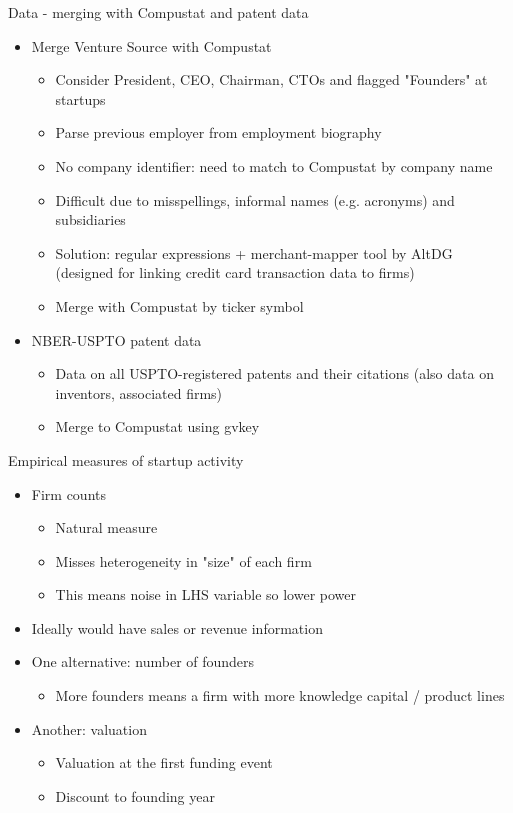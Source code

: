 \documentclass[english,usenames,dvipsnames]{beamer}
\begin{document}
\begin{frame}{Data - merging with Compustat and patent data}
\begin{itemize}
	\item Merge Venture Source with Compustat
	\begin{itemize}
		\item Consider President, CEO, Chairman, CTOs and flagged "Founders" at startups
		\item Parse previous employer from employment biography
		\item No company identifier: need to match to Compustat by company name
		\item Difficult due to misspellings, informal names (e.g. acronyms) and subsidiaries
		\item \alert{Solution:} regular expressions + merchant-mapper tool by AltDG (designed for linking credit card transaction data to firms)
		\item Merge with Compustat by ticker symbol
	\end{itemize}
	\item NBER-USPTO patent data
	\begin{itemize}
		\item Data on all USPTO-registered patents and their citations (also data on inventors, associated firms)
		\item Merge to Compustat using gvkey
	\end{itemize}
\end{itemize}
\end{frame}

\begin{frame}{Empirical measures of startup activity}
\begin{itemize}
	\item Firm counts
	\begin{itemize}
		\item Natural measure
		\item Misses heterogeneity in "size" of each firm
		\item This means noise in LHS variable so lower power
	\end{itemize}
	\item Ideally would have sales or revenue information
	\item One alternative: \alert{number of founders}
	\begin{itemize}
		\item More founders means a firm with more knowledge capital / product lines
	\end{itemize}
	\item Another: \alert{valuation}
	\begin{itemize}
		\item Valuation at the first funding event
		\item Discount to founding year 
	\end{itemize}
\end{itemize}
\end{frame}
\end{document}
